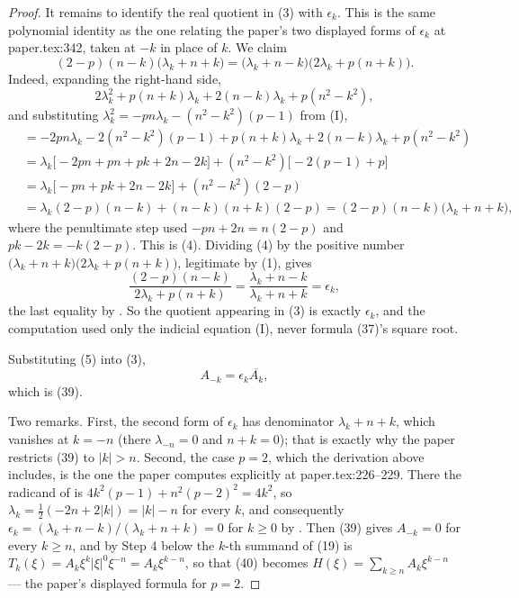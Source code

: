 \begin{proof}
It remains to identify the real quotient in (3) with $\epsilon_k$.  This is the
same polynomial identity as the one relating the paper's two displayed forms of
$\epsilon_k$ at paper.tex:342, taken at $-k$ in place of $k$.  We claim
\begin{equation}\tag{4}
  (2-p)(n-k)\bigl(\lambda_k+n+k\bigr)
  =\bigl(\lambda_k+n-k\bigr)\bigl(2\lambda_k+p(n+k)\bigr).
\end{equation}
Indeed, expanding the right-hand side,
\[
  2\lambda_k^2+p(n+k)\lambda_k+2(n-k)\lambda_k+p(n^2-k^2),
\]
and substituting $\lambda_k^2=-pn\lambda_k-(n^2-k^2)(p-1)$ from (I),
\begin{align*}
  &=-2pn\lambda_k-2(n^2-k^2)(p-1)+p(n+k)\lambda_k+2(n-k)\lambda_k+p(n^2-k^2)\\
  &=\lambda_k\bigl[-2pn+pn+pk+2n-2k\bigr]+(n^2-k^2)\bigl[-2(p-1)+p\bigr]\\
  &=\lambda_k\bigl[-pn+pk+2n-2k\bigr]+(n^2-k^2)(2-p)\\
  &=\lambda_k(2-p)(n-k)+(n-k)(n+k)(2-p)
  =(2-p)(n-k)\bigl(\lambda_k+n+k\bigr),
\end{align*}
where the penultimate step used $-pn+2n=n(2-p)$ and $pk-2k=-k(2-p)$.  This is
(4).  Dividing (4) by the positive number
$\bigl(\lambda_k+n+k\bigr)\bigl(2\lambda_k+p(n+k)\bigr)$, legitimate by (1),
gives
\begin{equation}\tag{5}
  \frac{(2-p)(n-k)}{2\lambda_k+p(n+k)}
  =\frac{\lambda_k+n-k}{\lambda_k+n+k}=\epsilon_k,
\end{equation}
the last equality by .  So the quotient appearing in (3) is
exactly $\epsilon_k$, and the computation used only the indicial equation (I),
never formula (37)'s square root.

Substituting (5) into (3),
\[
  A_{-k}=\epsilon_k\overline{A_k},
\]
which is (39).

Two remarks.  First, the second form of $\epsilon_k$ has denominator
$\lambda_k+n+k$, which vanishes at $k=-n$ (there $\lambda_{-n}=0$ and
$n+k=0$); that is exactly why the paper restricts (39) to $|k|>n$.  Second,
the case $p=2$, which the derivation above includes, is the one the paper
computes explicitly at paper.tex:226--229.  There the radicand of
 is $4k^2(p-1)+n^2(p-2)^2=4k^2$, so
$\lambda_k=\tfrac12(-2n+2|k|)=|k|-n$ for every $k$, and consequently
$\epsilon_k=(\lambda_k+n-k)/(\lambda_k+n+k)=0$ for $k\ge0$ by
.  Then (39) gives $A_{-k}=0$ for every $k\ge n$, and by
Step 4 below the $k$-th summand of (19) is
$T_k(\xi)=A_k\xi^k|\xi|^{0}\xi^{-n}=A_k\xi^{k-n}$, so that (40) becomes
$H(\xi)=\sum_{k\ge n}A_k\xi^{k-n}$ --- the paper's displayed formula for
$p=2$.


\end{proof}
